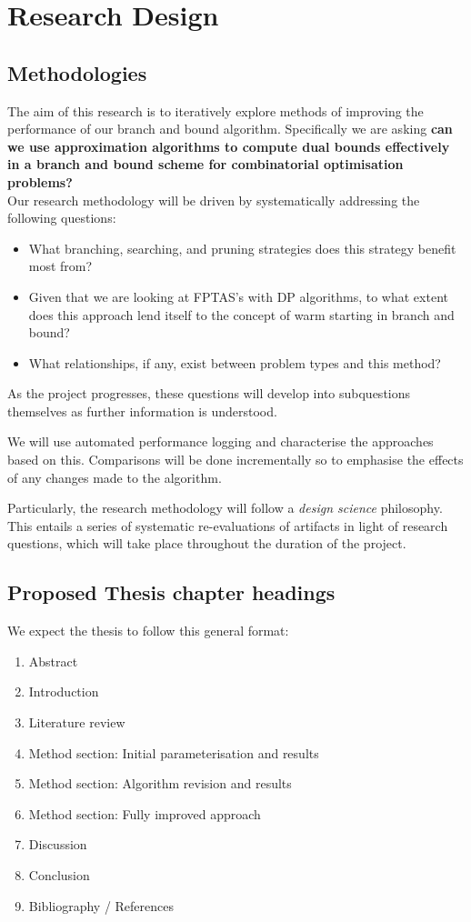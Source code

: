 \documentclass[12pt, a4paper]{article}
\begin{document}
\section{Research Design}

\subsection{Methodologies}

The aim of this research is to iteratively explore methods of improving the performance of our branch and bound algorithm. Specifically we are asking \textbf{can we use approximation algorithms to compute dual bounds effectively in a branch and bound scheme for combinatorial optimisation problems?}\\

Our research methodology will be driven by systematically addressing the following questions:

\begin{itemize}
\item What branching, searching, and pruning strategies does this strategy benefit most from?
\item Given that we are looking at FPTAS's with DP algorithms, to what extent does this approach lend itself to the concept of warm starting in branch and bound?
\item What relationships, if any, exist between problem types and this method?
\end{itemize}

As the project progresses, these questions will develop into subquestions themselves as further information is understood.

We will use automated performance logging and characterise the approaches based on this. Comparisons will be done incrementally so to emphasise the effects of any changes made to the algorithm.

Particularly, the research methodology will follow a \textit{design science} philosophy. This entails a series of systematic re-evaluations of artifacts in light of research questions, which will take place throughout the duration of the project. 

\subsection{Proposed Thesis chapter headings}
We expect the thesis to follow this general format:
\begin{enumerate}
  \item Abstract
  \item Introduction
  \item Literature review
  \item Method section: Initial parameterisation and results
  \item Method section: Algorithm revision and results 
  \item Method section: Fully improved approach
  \item Discussion
  \item Conclusion
  \item Bibliography / References
\end{enumerate}
\newpage
\end{document}
